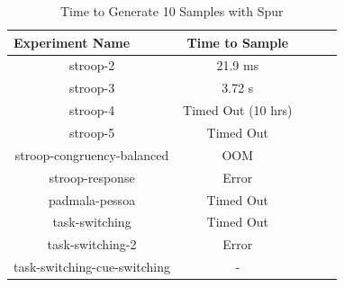 




\begin{table}[htb]
  \centering
  \caption{Time to Generate 10 Samples with Spur}
\begin{tabular}{|c|c|c|c|c|}
\hline
\multicolumn{1}{|l|}{Experiment Name} & Time to Sample                \\ \hline
stroop-2                              & 21.9 ms                       \\ \hline
stroop-3                              & 3.72 s                        \\ \hline
stroop-4                              & Timed Out (10 hrs)            \\ \hline
stroop-5                              & Timed Out                     \\ \hline
stroop-congruency-balanced            & OOM                           \\ \hline  %
stroop-response                       & Error                         \\ \hline  %
padmala-pessoa                        & Timed Out                     \\ \hline  %
task-switching                        & Timed Out                     \\ \hline  %
task-switching-2                      & Error                         \\ \hline  %
task-switching-cue-switching          & -                             \\ \hline  %
\end{tabular}
\label{tab:benchmark_experiments_spur}%
\end{table}


